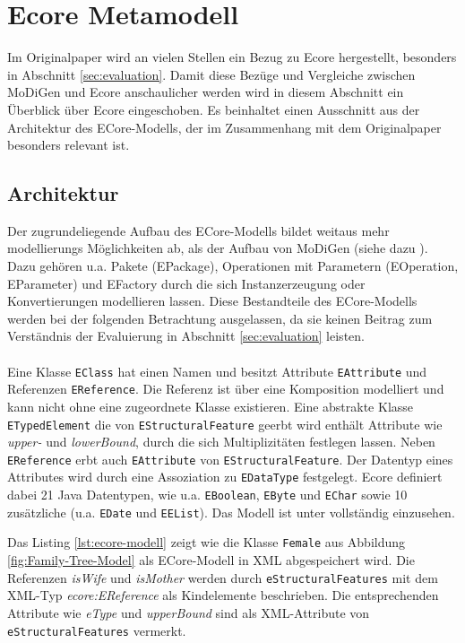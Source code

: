 \section{Ecore Metamodell}
Im Originalpaper \cite{gerhart2015approach} wird an vielen Stellen ein Bezug zu Ecore hergestellt, besonders in Abschnitt \ref{sec:evaluation}. Damit diese Bezüge und Vergleiche zwischen MoDiGen und Ecore anschaulicher werden wird in diesem Abschnitt ein Überblick über Ecore eingeschoben. Es beinhaltet einen Ausschnitt aus der Architektur des ECore-Modells, der im Zusammenhang mit dem Originalpaper besonders relevant ist.


\subsection{Architektur}
Der zugrundeliegende Aufbau des ECore-Modells bildet weitaus mehr modellierungs Möglichkeiten ab, als der Aufbau von MoDiGen (siehe dazu \cite{eclipse_ecore}). Dazu gehören u.a. Pakete (EPackage), Operationen mit Parametern (EOperation, EParameter) und EFactory durch die sich Instanzerzeugung oder Konvertierungen modellieren lassen. Diese Bestandteile des ECore-Modells werden bei der folgenden Betrachtung ausgelassen, da sie keinen Beitrag zum Verständnis der Evaluierung in Abschnitt \ref{sec:evaluation} leisten.\\
\\
Eine Klasse \texttt{EClass} hat einen Namen und besitzt Attribute \texttt{EAttribute} und Referenzen \texttt{EReference}. Die Referenz ist über eine Komposition modelliert und kann nicht ohne eine zugeordnete Klasse existieren. Eine abstrakte Klasse \texttt{ETypedElement} die von \texttt{EStructuralFeature} geerbt wird enth\"alt Attribute wie \textit{upper-} und \textit{lowerBound}, durch die sich Multiplizitäten festlegen lassen. Neben \texttt{EReference} erbt auch \texttt{EAttribute} von \texttt{EStructuralFeature}. Der Datentyp eines Attributes wird durch eine Assoziation zu \texttt{EDataType} festgelegt. Ecore definiert dabei 21 Java Datentypen, wie u.a. \texttt{EBoolean}, \texttt{EByte} und \texttt{EChar} sowie 10 zus\"atzliche (u.a. \texttt{EDate} und \texttt{EEList}). Das Modell ist unter \cite{eclipse_ecore} vollst\"andig einzusehen.



Das Listing \ref{lst:ecore-modell} zeigt wie die Klasse \texttt{Female} aus Abbildung \ref{fig:Family-Tree-Model} als ECore-Modell in XML abgespeichert wird. Die Referenzen \textit{isWife} und \textit{isMother} werden durch \texttt{eStructuralFeatures} mit dem XML-Typ \textit{ecore:EReference} als Kindelemente beschrieben. Die entsprechenden Attribute wie \textit{eType} und \textit{upperBound} sind als XML-Attribute von \texttt{eStructuralFeatures} vermerkt.



